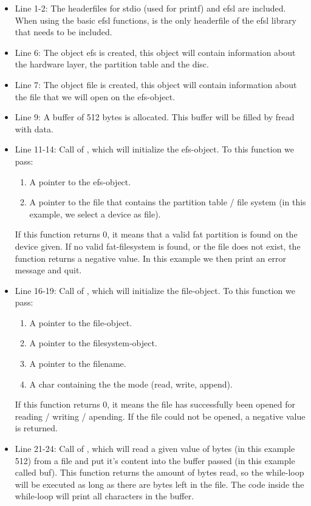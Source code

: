 \begin{itemize}
	\item{Line 1-2: The headerfiles for stdio (used for printf) and efsl 
		are included. When using the basic efsl functions,  is the
		only headerfile of the efsl library that needs to be included.}
	\item{Line 6: The object efs is created, this object will contain 
		information about the hardware layer, the partition table and
		the disc.}
	\item{Line 7: The object file is created, this object will contain
		information about the file that we will open on the efs-object.}
	\item{Line 9: A buffer of 512 bytes is allocated. This buffer will
	 	be filled by fread with data.}
	\item{Line 11-14: Call of , which will initialize the efs-object.
		To this function we pass:
		\begin{enumerate}
			\item{A pointer to the efs-object.}
			\item{A pointer to the file that contains the partition table /
				file system (in this example, we select a device as file).}
		\end{enumerate}
		If this function returns 0, it means that a valid fat partition is
		found on the device given. 
		If no valid fat-filesystem is found, or the file does not exist, the 
		function returns a negative value. In this example we then print an
		error message and quit.}
	\item{Line 16-19: Call of , which will initialize the 
		file-object. To this function we pass:
		\begin{enumerate}
			\item{A pointer to the file-object.}
			\item{A pointer to the filesystem-object.} 
			\item{A pointer to the filename.}
			\item{A char containing the the mode (read, write, append).}
		\end{enumerate}
		If this function returns 0, it means the file has successfully been
		opened for reading / writing / apending.
		If the file could not be opened, a negative value is returned.
	}
	\item{Line 21-24: Call of , which will read a given value of
		bytes (in this example 512) from a file and put it's content into
		the buffer passed (in this example called buf). This function returns
		the amount of bytes read, so the while-loop will be executed as long
		as there are bytes left in the file. The code inside the while-loop
		will print all characters in the buffer.}
\end{itemize}
